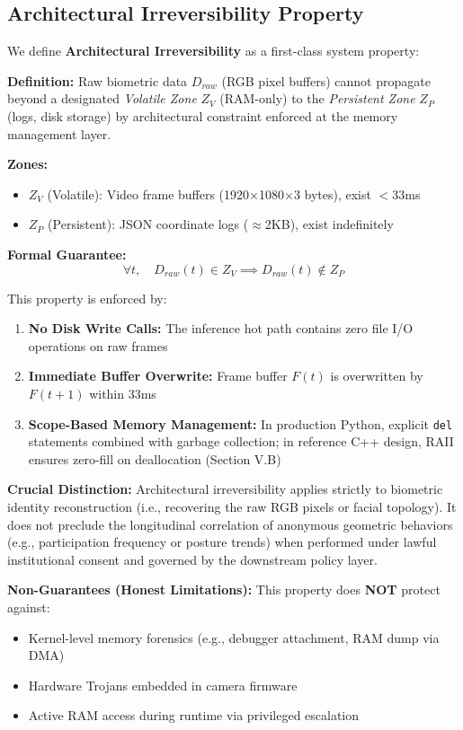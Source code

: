 \documentclass[conference]{IEEEtran}
\begin{document}
\subsection{Architectural Irreversibility Property}
We define \textbf{Architectural Irreversibility} as a first-class system property:

\textbf{Definition:} Raw biometric data $D_{raw}$ (RGB pixel buffers) cannot propagate beyond a designated \textit{Volatile Zone} $Z_V$ (RAM-only) to the \textit{Persistent Zone} $Z_P$ (logs, disk storage) by architectural constraint enforced at the memory management layer.

\textbf{Zones:}
\begin{itemize}
    \item $Z_V$ (Volatile): Video frame buffers (1920$\times$1080$\times$3 bytes), exist $<$33ms
    \item $Z_P$ (Persistent): JSON coordinate logs ($\approx$2KB), exist indefinitely
\end{itemize}

\textbf{Formal Guarantee:}
$$\forall t, \quad D_{raw}(t) \in Z_V \implies D_{raw}(t) \notin Z_P$$

This property is enforced by:
\begin{enumerate}
    \item \textbf{No Disk Write Calls:} The inference hot path contains zero file I/O operations on raw frames
    \item \textbf{Immediate Buffer Overwrite:} Frame buffer $F(t)$ is overwritten by $F(t+1)$ within 33ms
    \item \textbf{Scope-Based Memory Management:} In production Python, explicit \texttt{del} statements combined with garbage collection; in reference C++ design, RAII ensures zero-fill on deallocation (Section V.B)
\end{enumerate}

\textbf{Crucial Distinction:} Architectural irreversibility applies strictly to biometric identity reconstruction (i.e., recovering the raw RGB pixels or facial topology). It does not preclude the longitudinal correlation of anonymous geometric behaviors (e.g., participation frequency or posture trends) when performed under lawful institutional consent and governed by the downstream policy layer.

\textbf{Non-Guarantees (Honest Limitations):}
This property does \textbf{NOT} protect against:
\begin{itemize}
    \item Kernel-level memory forensics (e.g., debugger attachment, RAM dump via DMA)
    \item Hardware Trojans embedded in camera firmware
    \item Active RAM access during runtime via privileged escalation
\end{itemize}
\end{document}
